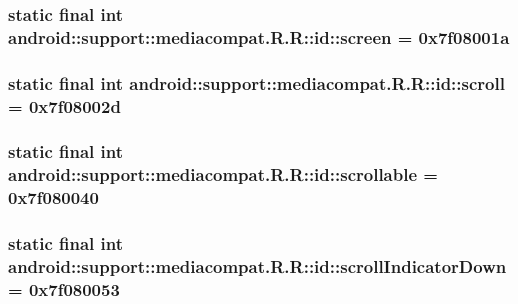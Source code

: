 \hypertarget{classandroid_1_1support_1_1mediacompat_1_1_r_1_1id_2c6ede7dd41d6afae5fc6cb48044b739}{
\subsubsection[{screen}]{\setlength{\rightskip}{0pt plus 5cm}static final int android::support::mediacompat.R.R::id::screen = 0x7f08001a}}
\label{classandroid_1_1support_1_1mediacompat_1_1_r_1_1id_2c6ede7dd41d6afae5fc6cb48044b739}


\hypertarget{classandroid_1_1support_1_1mediacompat_1_1_r_1_1id_2aaa6d1924ec43b6f5dc0e61fc0579ae}{
\subsubsection[{scroll}]{\setlength{\rightskip}{0pt plus 5cm}static final int android::support::mediacompat.R.R::id::scroll = 0x7f08002d}}
\label{classandroid_1_1support_1_1mediacompat_1_1_r_1_1id_2aaa6d1924ec43b6f5dc0e61fc0579ae}


\hypertarget{classandroid_1_1support_1_1mediacompat_1_1_r_1_1id_04f68780ca650e512ed2f7486abb00cd}{
\subsubsection[{scrollable}]{\setlength{\rightskip}{0pt plus 5cm}static final int android::support::mediacompat.R.R::id::scrollable = 0x7f080040}}
\label{classandroid_1_1support_1_1mediacompat_1_1_r_1_1id_04f68780ca650e512ed2f7486abb00cd}


\hypertarget{classandroid_1_1support_1_1mediacompat_1_1_r_1_1id_0d25b4319060c6f8bc9b125437fc1418}{
\subsubsection[{scrollIndicatorDown}]{\setlength{\rightskip}{0pt plus 5cm}static final int android::support::mediacompat.R.R::id::scrollIndicatorDown = 0x7f080053}}
\label{classandroid_1_1support_1_1mediacompat_1_1_r_1_1id_0d25b4319060c6f8bc9b125437fc1418}


